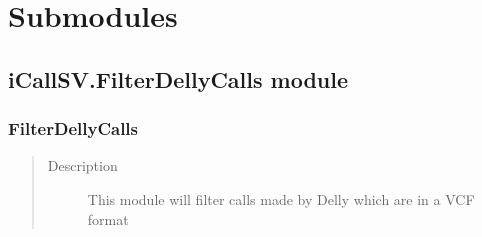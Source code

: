 \documentclass[letterpaper,10pt,english]{sphinxmanual}
\begin{document}
\section{Submodules}
\label{iCallSV:submodules}

\subsection{iCallSV.FilterDellyCalls module}
\label{iCallSV:icallsv-filterdellycalls-module}\label{iCallSV:module-iCallSV.FilterDellyCalls}

\subsubsection{FilterDellyCalls}
\label{iCallSV:filterdellycalls}\begin{quote}\begin{description}
\item[{Description}] \leavevmode
This module will filter calls made by Delly which are in a VCF format

\end{description}\end{quote}
\end{document}
